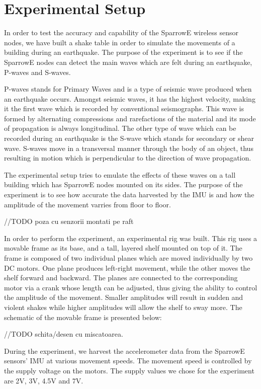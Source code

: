 \section{Experimental Setup}

In order to test the accuracy and capability of the SparrowE wireless sensor nodes, we 
have built a shake table in order to simulate the movements of a building during an earthquake.
The purpose of the experiment is to see if the SparrowE nodes can detect the main waves which 
are felt during an earthquake, P-waves and S-waves.

P-waves stands for Primary Waves and is a type of seismic wave produced when an earthquake occurs.
Amongst seismic waves, it has the highest velocity, making it the first wave which is recorded by 
conventional seismographs. This wave is formed by alternating compressions and rarefactions of the 
material and its mode of propagation is always longitudinal. The other type of wave which can be 
recorded during an earthquake is the S-wave which stands for secondary or shear wave. S-waves move 
in a transversal manner through the body of an object, thus resulting in motion which is perpendicular 
to the direction of wave propagation. 

The experimental setup tries to emulate the effects of these waves on a tall building which has SparrowE 
nodes mounted on its sides. The purpose of the experiment is to see how accurate the data harvested by the 
IMU is and how the amplitude of the movement varries from floor to floor.

//TODO poza cu senzorii montati pe raft

In order to perform the experiment, an experimental rig was built. This rig uses a movable frame as its base, 
and a tall, layered shelf mounted on top of it. The frame is composed of two individual planes which are moved 
individually by two DC motors. One plane produces left-right movement, while the other moves the shelf forward and 
backward. The planes are connected to the corresponding motor via a crank whose length can be adjusted, thus giving the 
ability to control the amplitude of the movement. Smaller amplitudes will result in sudden and violent shakes while 
higher amplitudes will allow the shelf to sway more. The schematic of the movable frame is presented below:

//TODO schita/desen cu miscatoarea.

During the experiment, we harvest the accelerometer data from the SparrowE sensors' IMU at various movement speeds.
The movement speed is controlled by the supply voltage on the motors. The supply values we chose for the experiment 
are 2V, 3V, 4.5V and 7V.
